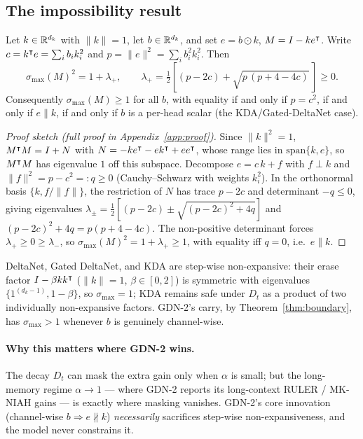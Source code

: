 \documentclass[11pt,letterpaper,logo]{yalearxiv}
\newcommand{\smax}{\sigma_{\max}}
\begin{document}
\subsection{The impossibility result}

\begin{theorem}
\label{thm:boundary}
Let $k \in \mathbb{R}^{d_k}$ with $\|k\|=1$, let $b \in \mathbb{R}^{d_k}$, and set $e = b \odot k$,
$M = I - k e^{\intercal}$. Write $c = k^{\intercal} e = \sum_i b_i k_i^2$ and
$p = \|e\|^2 = \sum_i b_i^2 k_i^2$. Then
\begin{equation}
  \smax(M)^2 = 1 + \lambda_+,
  \qquad
  \lambda_+ = \tfrac12\!\left[(p - 2c) + \sqrt{p\,(p + 4 - 4c)}\,\right] \ge 0 .
  \label{eq:boundary}
\end{equation}
Consequently $\smax(M) \ge 1$ for all $b$, with equality if and only if $p = c^2$,
if and only if $e \parallel k$, if and only if $b$ is a per-head scalar
(the KDA/Gated-DeltaNet case).
\end{theorem}

\begin{proof}[Proof sketch (full proof in Appendix~\ref{app:proof})]
Since $\|k\|^2 = 1$, $M^{\intercal}M = I + N$ with $N = -k e^{\intercal} - e k^{\intercal} + e e^{\intercal}$,
whose range lies in $\mathrm{span}\{k,e\}$, so $M^{\intercal}M$ has eigenvalue $1$ off this
subspace. Decompose $e = c\,k + f$ with $f \perp k$ and $\|f\|^2 = p - c^2 =: q \ge
0$ (Cauchy--Schwarz with weights $k_i^2$). In the orthonormal basis $\{k, f/\|f\|\}$,
the restriction of $N$ has trace $p - 2c$ and determinant $-q \le 0$, giving
eigenvalues $\lambda_\pm = \tfrac12[(p-2c) \pm \sqrt{(p-2c)^2 + 4q}]$ and
$(p-2c)^2 + 4q = p(p+4-4c)$. The non-positive determinant forces
$\lambda_+ \ge 0 \ge \lambda_-$, so $\smax(M)^2 = 1 + \lambda_+ \ge 1$, with equality
iff $q = 0$, i.e.\ $e \parallel k$.
\end{proof}

\begin{corollary}
\label{cor:safe}
DeltaNet, Gated DeltaNet, and KDA are step-wise non-expansive: their erase factor
$I - \beta k k^{\intercal}$ ($\|k\|=1$, $\beta\in[0,2]$) is symmetric with eigenvalues
$\{1^{(d_k-1)}, 1-\beta\}$, so $\smax = 1$; KDA remains safe under $D_t$ as a product
of two individually non-expansive factors. GDN-2's carry, by
Theorem~\ref{thm:boundary}, has $\smax > 1$ whenever $b$ is genuinely channel-wise.
\end{corollary}

\paragraph{Why this matters where GDN-2 wins.} The decay $D_t$ can mask the extra
gain only when $\alpha$ is small; but the long-memory regime $\alpha \to 1$ --- where
GDN-2 reports its long-context RULER / MK-NIAH gains --- is exactly where masking
vanishes. GDN-2's core innovation (channel-wise $b \Rightarrow e \not\parallel k$)
\emph{necessarily} sacrifices step-wise non-expansiveness, and the model never
constrains it.
\end{document}
